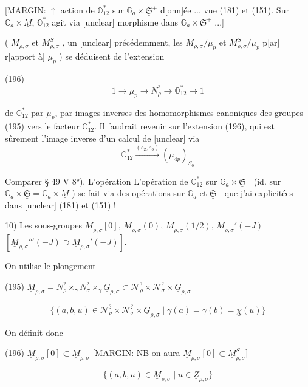 [MARGIN: $\uparrow$ action de $\mathbb{O}_{12}^*$ sur $\mathbb{G}_a \times \underline{\mathfrak{S}}^+$ d[onn]ée ... vue (181) et (151). Sur $\mathbb{G}_a \times \underline{M}$, $\mathbb{O}_{12}^*$ agit via [unclear] morphisme dans $\mathbb{G}_a \times \underline{\mathfrak{S}}^+$ ...]

( $M_{\rho,\sigma}$ et $M_{\rho,\sigma}^S$ , un [unclear] précédemment,
les $M_{\rho,\sigma}/\mu_p$ et $M_{\rho,\sigma}^S/\mu_p$ p[ar] r[apport à] $\mu_p$ )
se déduisent de l'extension

(196) $$1 \rightarrow \mu_p \rightarrow N_\rho^? \rightarrow \mathbb{O}_{12}^* \rightarrow 1$$

de $\mathbb{O}_{12}^*$ par $\mu_p$, par images inverses
des homomorphismes canoniques des groupes
(195) vers le facteur $\mathbb{O}_{12}^*$. Il
faudrait revenir sur l'extension
(196), qui est sûrement l'image
inverse d'un calcul de [unclear]
via $$\mathbb{O}_{12}^* \xrightarrow{(\varepsilon_2, \varepsilon_3)} (\mu_{4p})_{S_0}$$

Comparer § 49 V 8°). L'opération
L'opération de $\mathbb{O}_{12}^*$ sur $\mathbb{G}_a \times \underline{\mathfrak{S}}^+$
(id. sur $\mathbb{G}_a \times \underline{\mathfrak{S}} = \mathbb{G}_a \times \underline{M}$ ) se fait
via des opérations sur $\mathbb{G}_a$ et $\underline{\mathfrak{S}}^+$ que
j'ai explicitées dans [unclear] (181) et (151) !

\newpage


10) Les sous-groupes $\underline{M}_{\rho, \sigma}[0]$, $\underline{M}_{\rho, \sigma}(0)$, $\underline{M}_{\rho, \sigma}(1/2)$, $\underline{M}_{\rho, \sigma}'(-J)$ $[\underline{M}_{\rho, \sigma}'''(-J) \supset \underline{M}_{\rho, \sigma}'(-J)]$.

On utilise le plongement

(195) $\underline{M}_{\rho, \sigma} = N_\rho^? \times_\gamma N_\sigma^? \times_\gamma \underline{G}_{\rho, \sigma} \subset \mathcal{N}_\rho^? \times \mathcal{N}_\sigma^? \times \underline{G}_{\rho, \sigma}$
$$ \Big\| $$
$$ \{(a, b, u) \in \mathcal{N}_\rho^? \times \mathcal{N}_\sigma^? \times \underline{G}_{\rho, \sigma} \mid \gamma(a) = \gamma(b) = \underline{\chi}(u)\} $$

On définit donc

(196) $\underline{M}_{\rho, \sigma}[0] \subset \underline{M}_{\rho, \sigma}$
[MARGIN: NB on aura $\underline{M}_{\rho, \sigma}[0] \subset \underline{M}_{\rho, \sigma}^S$]
$$ \| $$
$$ \{(a, b, u) \in \underline{M}_{\rho, \sigma} \mid u \in \underline{Z}_{\rho, \sigma}\} $$

